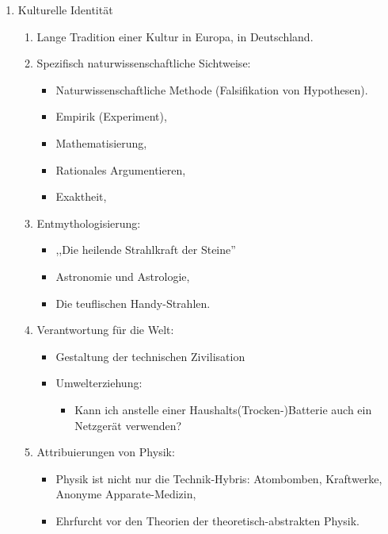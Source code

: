 \documentclass[11pt,a4paper]{book}
\begin{document}
\begin{enumerate}
	\item Kulturelle Identit\"{a}t

\begin{enumerate}

\item Lange Tradition einer Kultur in Europa, in
Deutschland.

\item Spezifisch naturwissenschaftliche Sichtweise:
\begin{itemize}
\item Naturwissenschaftliche Methode (Falsifikation von Hypothesen).
\item Empirik (Experiment),
\item Mathematisierung,
\item Rationales Argumentieren,
\item Exaktheit,
\end{itemize}

\item Entmythologisierung:
\begin{itemize}
\item ,,Die heilende Strahlkraft der Steine''
\item Astronomie und Astrologie,
\item Die teuflischen Handy-Strahlen.
\end{itemize}

\item Verantwortung f\"{u}r die Welt:
\begin{itemize}
\item Gestaltung der technischen Zivilisation
\item Umwelterziehung:
\begin{itemize}
\item Kann ich anstelle einer Haushalts(Trocken-)Batterie auch ein
Netzger\"{a}t verwenden?
\end{itemize}

\end{itemize}


\item Attribuierungen von Physik:
\begin{itemize}
\item Physik ist nicht nur die Technik-Hybris: Atombomben,
Kraftwerke, Anonyme Apparate-Medizin,
\item
Ehrfurcht vor den Theorien der theoretisch-abstrakten Physik.
\end{itemize}


\end{enumerate}
\end{enumerate}
\end{document}
